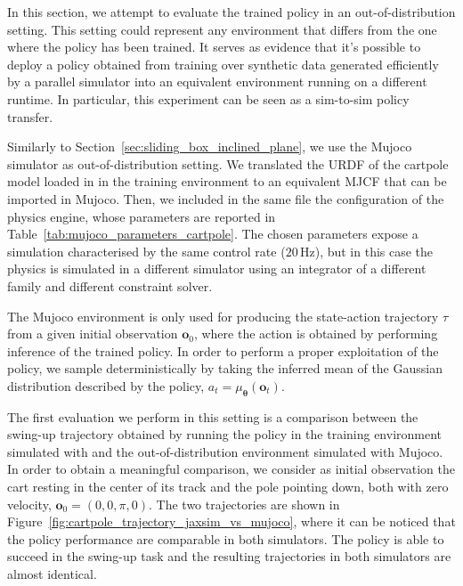 In this section, we attempt to evaluate the trained policy in an out-of-distribution setting.
This setting could represent any environment that differs from the one where the policy has been trained.
It serves as evidence that it's possible to deploy a policy obtained from training over synthetic data generated efficiently by a parallel simulator into an equivalent environment running on a different runtime.
In particular, this experiment can be seen as a sim-to-sim policy transfer.

Similarly to Section~\ref{sec:sliding_box_inclined_plane}, we use the Mujoco simulator as out-of-distribution setting.
We translated the \ac{URDF} of the cartpole model loaded in \jaxsim in the training environment to an equivalent \ac{MJCF} that can be imported in Mujoco.
Then, we included in the same file the configuration of the physics engine, whose parameters are reported in Table~\ref{tab:mujoco_parameters_cartpole}.
The chosen parameters expose a simulation characterised by the same control rate ($20\,$Hz), but in this case the physics is simulated in a different simulator using an integrator of a different family and different constraint solver.

The Mujoco environment is only used for producing the state-action trajectory $\tau$ from a given initial observation $\mathbf{o}_0$, where the action is obtained by performing inference of the trained policy.
In order to perform a proper exploitation of the policy, we sample deterministically by taking the inferred mean of the Gaussian distribution described by the policy, \ie $a_t = \mu_{\boldsymbol{\theta}}(\mathbf{o}_t)$.

The first evaluation we perform in this setting is a comparison between the swing-up trajectory obtained by running the policy in the training environment simulated with \jaxsim and the out-of-distribution environment simulated with Mujoco.
In order to obtain a meaningful comparison, we consider as initial observation the cart resting in the center of its track and the pole pointing down, both with zero velocity, \ie $\mathbf{o}_0 = (0, 0, \pi, 0)$.
The two trajectories are shown in Figure~\ref{fig:cartpole_trajectory_jaxsim_vs_mujoco}, where it can be noticed that the policy performance are comparable in both simulators.
The policy is able to succeed in the swing-up task and the resulting trajectories in both simulators are almost identical.

